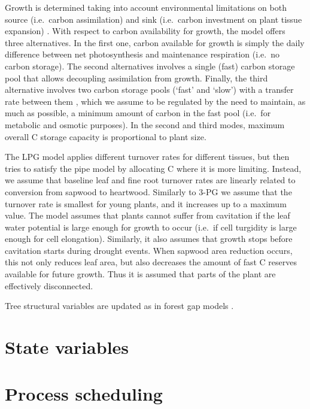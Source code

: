 \documentclass[]{book}
\begin{document}
Growth is determined taking into account environmental limitations on
both source (i.e.~carbon assimilation) and sink (i.e.~carbon investment
on plant tissue expansion)
\citep{Fatichi2014, Guillemot2015, Korner2015}. With respect to carbon
availability for growth, the model offers three alternatives. In the
first one, carbon available for growth is simply the daily difference
between net photosynthesis and maintenance respiration (i.e.~no carbon
storage). The second alternatives involves a single (fast) carbon
storage pool that allows decoupling assimilation from growth. Finally,
the third alternative involves two carbon storage pools (`fast' and
`slow') with a transfer rate between them
\citep{Richardson2013, Dietze2014}, which we assume to be regulated by
the need to maintain, as much as possible, a minimum amount of carbon in
the fast pool (i.e.~for metabolic and osmotic purposes). In the second
and third modes, maximum overall C storage capacity is proportional to
plant size.

The LPG model \citep{Sitch2003} applies different turnover rates for
different tissues, but then tries to satisfy the pipe model
\citep{Shinozaki1964} by allocating C where it is more limiting.
Instead, we assume that baseline leaf and fine root turnover rates are
linearly related to conversion from sapwood to heartwood. Similarly to
3-PG \citep{Landsberg1997} we assume that the turnover rate is smallest
for young plants, and it increases up to a maximum value. The model
assumes that plants cannot suffer from cavitation if the leaf water
potential is large enough for growth to occur (i.e.~if cell turgidity is
large enough for cell elongation). Similarly, it also assumes that
growth stops before cavitation starts during drought events. When
sapwood area reduction occurs, this not only reduces leaf area, but also
decreases the amount of fast C reserves available for future growth.
Thus it is assumed that parts of the plant are effectively disconnected.

Tree structural variables are updated as in forest gap models
\citep{Lindner1997}.

\section{State variables}\label{state-variables-2}

\section{Process scheduling}\label{process-scheduling-2}
\end{document}
